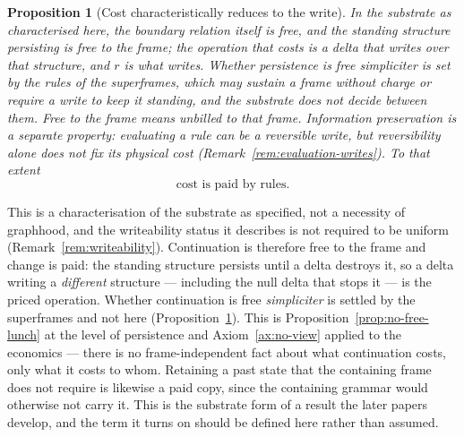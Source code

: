 \documentclass[11pt,a4paper]{article}
\newtheorem{proposition}[definition]{Proposition}
\theoremstyle{remark}\newtheorem{remark}[definition]{Remark}
\begin{document}
\begin{proposition}[Cost characteristically reduces to the write]\label{prop:economics}
In the substrate as characterised here, the boundary relation itself is free, and the standing structure persisting is free \emph{to the frame}; the operation that costs is a delta that writes over that structure, and $r$ is what writes. Whether persistence is free \emph{simpliciter} is set by the rules of the superframes, which may sustain a frame without charge or require a write to keep it standing, and the substrate does not decide between them. \emph{Free} to the frame means unbilled to that frame. Information preservation is a separate property: evaluating a rule can be a reversible write, but reversibility alone does not fix its physical cost (Remark~\ref{rem:evaluation-writes}). To that extent
\[
\boxed{\text{cost is paid by rules.}}
\]
\end{proposition}
This is a characterisation of the substrate as specified, not a necessity of graphhood, and the writeability status it describes is not required to be uniform (Remark~\ref{rem:writeability}).
Continuation is therefore free to the frame and change is paid: the standing structure persists until a delta destroys it, so a delta writing a \emph{different} structure --- including the null delta that stops it --- is the priced operation. Whether continuation is free \emph{simpliciter} is settled by the superframes and not here (Proposition~\ref{prop:economics}). This is Proposition~\ref{prop:no-free-lunch} at the level of persistence and Axiom~\ref{ax:no-view} applied to the economics --- there is no frame-independent fact about what continuation costs, only what it costs to whom. Retaining a past state that the containing frame does not require is likewise a paid copy, since the containing grammar would otherwise not carry it. This is the substrate form of a result the later papers develop, and the term it turns on should be defined here rather than assumed.
\end{document}
